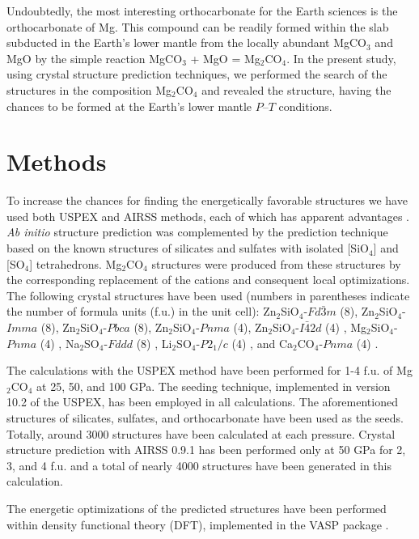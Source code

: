 \documentclass[a4paperm]{article}
\begin{document}
Undoubtedly, the most interesting orthocarbonate for the Earth sciences is the orthocarbonate of Mg. 
This compound can be readily formed within the slab subducted in the Earth's lower mantle from the locally abundant MgCO$_3$ and MgO by the simple reaction MgCO$_3$ + MgO = Mg$_2$CO$_4$.
In the present study, using crystal structure prediction techniques, we performed the search of the structures in the composition Mg$_2$CO$_4$ and revealed the structure, having the chances to be formed at the Earth's lower mantle $P$--$T$ conditions.


		\section*{Methods}

To increase the chances for finding the energetically favorable structures we have used both USPEX and AIRSS methods, each of which has apparent advantages \cite{oganov2019}.
{\it Ab initio} structure prediction was complemented by the prediction technique based on the known structures of silicates and sulfates with isolated [SiO$_4$] and [SO$_4$] tetrahedrons. 
Mg$_2$CO$_4$ structures were produced from these structures by the corresponding replacement of the cations and consequent local optimizations.
The following crystal structures have been used (numbers in parentheses indicate the number of formula units (f.u.) in the unit cell): Zn$_2$SiO$_4$-$Fd\bar{3}m$ (8), Zn$_2$SiO$_4$-$Imma$ (8), Zn$_2$SiO$_4$-$Pbca$ (8), Zn$_2$SiO$_4$-$Pnma$ (4), Zn$_2$SiO$_4$-$I\bar{4}2d$ (4) \cite{kanzaki2019}, Mg$_2$SiO$_4$-$Pnma$ (4) \cite{smyth1973}, Na$_2$SO$_4$-$Fddd$ (8) \cite{hawthorne1975}, Li$_2$SO$_4$-$P2_1/c$ (4) \cite{alcock1973}, and Ca$_2$CO$_4$-$Pnma$ (4) \cite{sagatova2020_ortho}.
 
The calculations with the USPEX method \cite{uspex1,uspex2,uspex3,uspex_topology} have been performed for 1-4 f.u. of Mg$_2$CO$_4$ at 25, 50, and 100 GPa.
The seeding technique, implemented in version 10.2 of the USPEX, has been employed in all calculations.
The aforementioned structures of silicates, sulfates, and orthocarbonate have been used as the seeds.
Totally, around 3000 structures have been calculated at each pressure.
Crystal structure prediction with AIRSS 0.9.1 \cite{airss1,airss2} has been performed only at 50 GPa for 2, 3, and 4 f.u. and a total of nearly 4000 structures have been generated in this calculation.

The energetic optimizations of the predicted structures have been performed within density functional theory (DFT), implemented in the VASP package \cite{vasp1,vasp2}.
\end{document}
